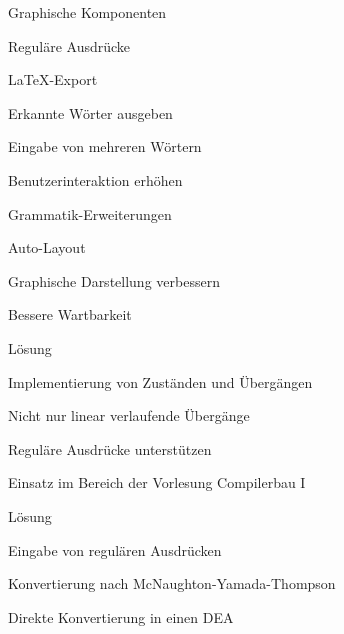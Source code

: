 



{
    \begin{itemgroup}{}
	\item Graphische Komponenten
	\item Reguläre Ausdrücke
	\item \LaTeX-Export
	\item Erkannte Wörter ausgeben
	\item Eingabe von mehreren Wörtern
	\item Benutzerinteraktion erhöhen
	\item Grammatik-Erweiterungen
	\item Auto-Layout
	\end{itemgroup}

    \vfill{}
}


{
    \begin{itemgroup}{}
	\item Graphische Darstellung verbessern
	\item Bessere Wartbarkeit
    \end{itemgroup}

    \begin{itemgroup}{Lösung}
	\item Implementierung von Zuständen und Übergängen
	\item Nicht nur linear verlaufende Übergänge
	\end{itemgroup}
    
    \vfill{}
}


{
    \begin{itemgroup}{}
	\item Reguläre Ausdrücke unterstützen
	\item Einsatz im Bereich der Vorlesung Compilerbau I
    \end{itemgroup}

    \begin{itemgroup}{Lösung}
	\item Eingabe von regulären Ausdrücken
	\item Konvertierung nach McNaughton-Yamada-Thompson
	\item Direkte Konvertierung in einen DEA
	\end{itemgroup}
    
    \vfill{}
}


